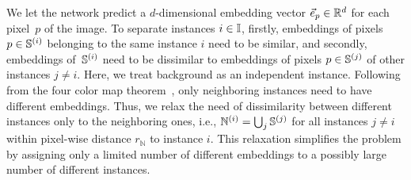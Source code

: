 \documentclass[runningheads,a4paper]{llncs}
\newcommand{\christian}[1]{\textcolor{blue}{[#1]}}
\newcommand{\thomas}[1]{\textcolor{purple}{[#1]}}
\begin{document}
We let the network predict a $d$-dimensional embedding vector $\vec{e}_p\in\mathbb{R}^d$ for each pixel~$p$ of the image. %
To separate instances $i\in\mathbb{I}$, firstly, embeddings of pixels $p\in\mathbb{S}^{(i)}$ belonging to the same instance $i$ need to be similar, and secondly, embeddings of~$\mathbb{S}^{(i)}$ need to be dissimilar to embeddings of pixels $p\in\mathbb{S}^{(j)}$ of other instances $j\neq i$. %
Here, we treat background as an independent instance.
Following from the four color map theorem~\cite{Appel1976}, only neighboring instances need to have different embeddings.
Thus, we relax the need of dissimilarity between different instances only to the neighboring ones, i.e., $\mathbb{N}^{(i)} = \bigcup_j\mathbb{S}^{(j)}$ for all instances $j\neq i$ within pixel-wise distance $r_{\mathbb{N}}$ to instance $i$.
This relaxation simplifies the problem by assigning only a limited number of different embeddings to a possibly large number of different instances.
\end{document}

